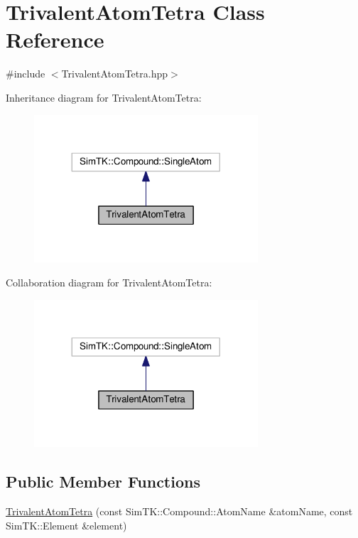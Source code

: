\hypertarget{classTrivalentAtomTetra}{}\section{Trivalent\+Atom\+Tetra Class Reference}
\label{classTrivalentAtomTetra}


{\ttfamily \#include $<$Trivalent\+Atom\+Tetra.\+hpp$>$}



Inheritance diagram for Trivalent\+Atom\+Tetra\+:\nopagebreak
\begin{figure}[H]
\begin{center}
\leavevmode
\includegraphics[width=236pt]{classTrivalentAtomTetra__inherit__graph}
\end{center}
\end{figure}


Collaboration diagram for Trivalent\+Atom\+Tetra\+:\nopagebreak
\begin{figure}[H]
\begin{center}
\leavevmode
\includegraphics[width=236pt]{classTrivalentAtomTetra__coll__graph}
\end{center}
\end{figure}
\subsection*{Public Member Functions}
\begin{DoxyCompactItemize}
\item 
\hyperlink{classTrivalentAtomTetra_aceb0dcbcafa9398de59f99b30a20a63a}{Trivalent\+Atom\+Tetra} (const Sim\+T\+K\+::\+Compound\+::\+Atom\+Name \&atom\+Name, const Sim\+T\+K\+::\+Element \&element)
\end{DoxyCompactItemize}


